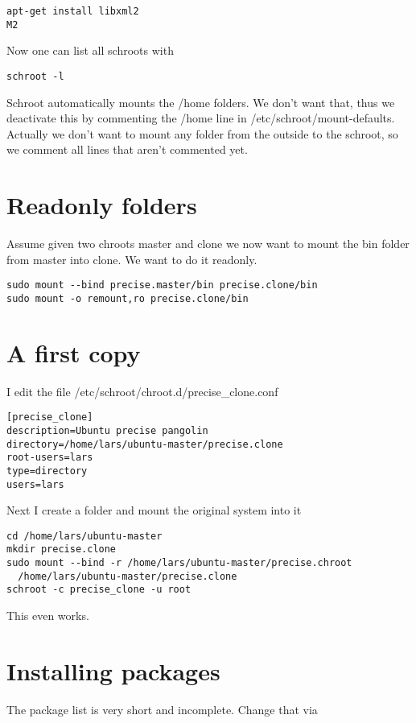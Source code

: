 \documentclass[a4paper]{article}
\begin{document}
\begin{verbatim}
apt-get install libxml2
M2
\end{verbatim}



Now one can list all schroots with

\begin{verbatim}
schroot -l
\end{verbatim}


Schroot automatically mounts the /home folders. We don't want that, thus we deactivate this by commenting the /home line in /etc/schroot/mount-defaults. Actually we don't want to mount any folder from the outside to the schroot, so we comment all lines that aren't commented yet.
\section{Readonly folders}

Assume given two chroots master and clone we now want to mount the bin folder from master into clone. We want to do it readonly.

\begin{verbatim}
sudo mount --bind precise.master/bin precise.clone/bin
sudo mount -o remount,ro precise.clone/bin
\end{verbatim}

\section{A first copy}
I edit the file /etc/schroot/chroot.d/precise\_clone.conf

\begin{verbatim}
[precise_clone]
description=Ubuntu precise pangolin
directory=/home/lars/ubuntu-master/precise.clone
root-users=lars
type=directory
users=lars
\end{verbatim}

Next I create a folder and mount the original system into it

\begin{verbatim}
cd /home/lars/ubuntu-master
mkdir precise.clone
sudo mount --bind -r /home/lars/ubuntu-master/precise.chroot 
  /home/lars/ubuntu-master/precise.clone
schroot -c precise_clone -u root
\end{verbatim}

This even works.

\section{Installing packages}
The package list is very short and incomplete. Change that via
\end{document}
